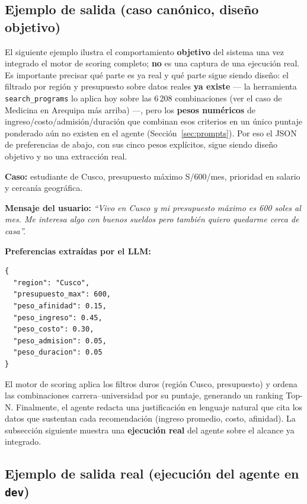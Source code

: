\subsection{Ejemplo de salida (caso can\'onico, dise\~no objetivo)}

El siguiente ejemplo ilustra el comportamiento \textbf{objetivo} del sistema
una vez integrado el motor de scoring completo; \textbf{no} es una captura de
una ejecuci\'on real. Es importante precisar qu\'e parte es ya real y qu\'e
parte sigue siendo dise\~no: el filtrado por regi\'on y presupuesto sobre
datos reales \textbf{ya existe} --- la herramienta \texttt{search\_programs}
lo aplica hoy sobre las 6\,208 combinaciones (ver el caso de Medicina en
Arequipa m\'as arriba) ---, pero los \textbf{pesos num\'ericos} de
ingreso/costo/admisi\'on/duraci\'on que combinan esos criterios en un \'unico
puntaje ponderado a\'un no existen en el agente (Secci\'on~\ref{sec:prompts}).
Por eso el JSON de preferencias de abajo, con sus cinco pesos expl\'icitos,
sigue siendo dise\~no objetivo y no una extracci\'on real.

\textbf{Caso:} estudiante de Cusco, presupuesto m\'aximo S/600/mes, prioridad en
salario y cercan\'ia geogr\'afica.

\textbf{Mensaje del usuario:} \textit{``Vivo en Cusco y mi presupuesto m\'aximo es
600 soles al mes. Me interesa algo con buenos sueldos pero tambi\'en quiero
quedarme cerca de casa''.}

\textbf{Preferencias extra\'idas por el LLM:}
\begin{lstlisting}[style=jsonstyle, caption={JSON de preferencias extraidas}, label={lst:json-prefs}]
{
  "region": "Cusco",
  "presupuesto_max": 600,
  "peso_afinidad": 0.15,
  "peso_ingreso": 0.45,
  "peso_costo": 0.30,
  "peso_admision": 0.05,
  "peso_duracion": 0.05
}
\end{lstlisting}

El motor de scoring aplica los filtros duros (regi\'on Cusco, presupuesto) y
ordena las combinaciones carrera--universidad por su puntaje, generando un ranking
Top-N. Finalmente, el agente redacta una justificaci\'on en lenguaje natural que
cita los datos que sustentan cada recomendaci\'on (ingreso promedio, costo,
afinidad). La subsecci\'on siguiente muestra una \textbf{ejecuci\'on real} del
agente sobre el alcance ya integrado.

\subsection{Ejemplo de salida real (ejecuci\'on del agente en \texttt{dev})}
\label{sub:evidencia-real}

